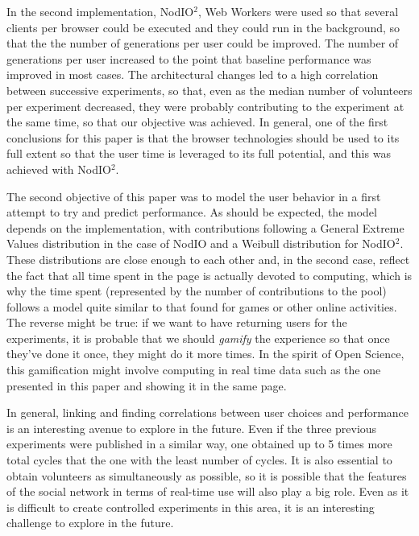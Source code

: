 \documentclass[journal,onecolumn]{IEEEtran}
\begin{document}
In the second implementation, {\sf NodIO$^2$}, Web Workers
were used so that several clients per browser could be executed and
they could run in the background, so that the the number of
generations per user could be improved. The number of generations per
user increased to the point that baseline performance was improved in
most cases. The architectural changes led to a high correlation
between successive experiments, so that, even as the median number of
volunteers per experiment decreased, they were probably contributing
to the experiment at the same time, so that our objective was
achieved. In general, one of the first conclusions for this paper is
that the browser technologies should be used to its full extent so
that the user time is leveraged to its full potential, and this was
achieved with {\sf NodIO$^2$}.

The second objective of this paper was to model the user behavior in a
first attempt to try and predict performance. As should be expected,
the model depends on the implementation, with contributions following
a General Extreme Values distribution in the case of {\sf NodIO} and a
Weibull distribution for {\sf NodIO$^2$}. These distributions are
close enough to each other and, in the second case, reflect the fact
that all time spent in the page is actually devoted to computing,
which is why the time spent (represented by the number of
contributions to the pool) follows a model quite similar to that found
for games or other online activities. The reverse might be true: if we
want to have returning users for the experiments, it is probable that
we should {\em gamify} the experience so that once they've done it
once, they might do it more times. In the spirit of Open Science, this
gamification might involve computing in real time data such as the one
presented in this paper and showing it in the same page. 

In general, linking and finding correlations between user choices and
performance is an interesting avenue to explore in the future. Even if
the three previous experiments were published in a similar way, one
obtained up to 5 times more total cycles  that the one with the least
number of cycles. It is also essential to obtain volunteers as
simultaneously as possible, so it is possible that the features of the
social network in terms of real-time use will also play a big
role. Even as it is difficult to create controlled experiments in this
area, it is an interesting challenge to explore in the future.
\end{document}
